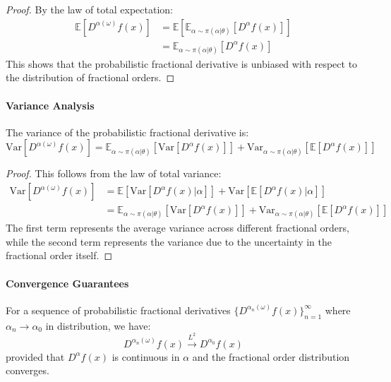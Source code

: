 \begin{proof}
By the law of total expectation:
\begin{align}
\mathbb{E}[D^{\alpha(\omega)} f(x)] &= \mathbb{E}[\mathbb{E}_{\alpha \sim \pi(\alpha|\theta)}[D^{\alpha} f(x)]] \\
&= \mathbb{E}_{\alpha \sim \pi(\alpha|\theta)}[D^{\alpha} f(x)]
\end{align}
This shows that the probabilistic fractional derivative is unbiased with respect to the distribution of fractional orders.
\end{proof}

\paragraph{Variance Analysis}

\begin{theorem}
The variance of the probabilistic fractional derivative is:
\begin{equation}
\text{Var}[D^{\alpha(\omega)} f(x)] = \mathbb{E}_{\alpha \sim \pi(\alpha|\theta)}[\text{Var}[D^{\alpha} f(x)]] + \text{Var}_{\alpha \sim \pi(\alpha|\theta)}[\mathbb{E}[D^{\alpha} f(x)]]
\end{equation}
\end{theorem}

\begin{proof}
This follows from the law of total variance:
\begin{align}
\text{Var}[D^{\alpha(\omega)} f(x)] &= \mathbb{E}[\text{Var}[D^{\alpha} f(x)|\alpha]] + \text{Var}[\mathbb{E}[D^{\alpha} f(x)|\alpha]] \\
&= \mathbb{E}_{\alpha \sim \pi(\alpha|\theta)}[\text{Var}[D^{\alpha} f(x)]] + \text{Var}_{\alpha \sim \pi(\alpha|\theta)}[\mathbb{E}[D^{\alpha} f(x)]]
\end{align}
The first term represents the average variance across different fractional orders, while the second term represents the variance due to the uncertainty in the fractional order itself.
\end{proof}

\paragraph{Convergence Guarantees}

\begin{theorem}
For a sequence of probabilistic fractional derivatives $\{D^{\alpha_n(\omega)} f(x)\}_{n=1}^{\infty}$ where $\alpha_n \to \alpha_0$ in distribution, we have:
\begin{equation}
D^{\alpha_n(\omega)} f(x) \xrightarrow{L^2} D^{\alpha_0} f(x)
\end{equation}
provided that $D^{\alpha} f(x)$ is continuous in $\alpha$ and the fractional order distribution converges.
\end{theorem}

